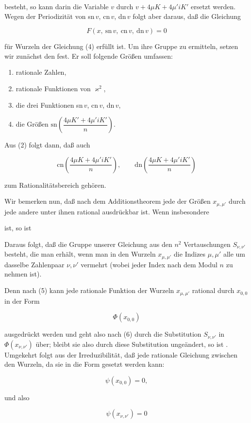 
besteht, so kann darin die Variable $v$ durch $v + 4\mu K + 4\mu' iK'$
ersetzt werden. Wegen der Periodizität von sn\,$v$, cn\,$v$, dn\,$v$ folgt
aber daraus, daß die Gleichung

\[
F(x,\ \mathrm{sn}\,v,\ \mathrm{cn}\,v,\ \mathrm{dn}\,v) = 0
\]

für  Wurzeln der Gleichung (4) erfüllt ist. Um ihre  Gruppe zu ermitteln, setzen wir zunächst den  fest. Er soll folgende Größen umfassen:

\begin{enumerate}
\item[1.] rationale Zahlen,
\item[2.] rationale Funktionen von $\varkappa^2$,
\item[3.] die drei Funktionen sn\,$v$, cn\,$v$, dn\,$v$,
\item[4.] die Größen $\mathrm{sn}\left(\dfrac{4\mu K' + 4\mu' iK'}{n}\right)$. %
\end{enumerate}

Aus (2) folgt dann, daß auch

\[
\mathrm{cn}\left(\frac{4\mu K + 4\mu' iK'}{n}\right), \qquad \mathrm{dn}\left(\frac{4\mu K + 4\mu' iK'}{n}\right)
\]

zum Rationalitätsbereich gehören.

Wir bemerken nun, daß nach dem Additionstheorem jede der
Größen $x_{\mu,\mu'}$ durch jede andere unter ihnen rational ausdrückbar
ist. Wenn insbesondere


ist, so ist


Daraus folgt, daß die  Gruppe unserer Gleichung
aus den $n^2$ Vertauschungen $S_{\nu,\nu'}$ besteht, die man erhält, wenn
man in den Wurzeln $x_{\mu,\mu'}$ die Indizes $\mu, \mu'$ alle um dasselbe
Zahlenpaar $\nu, \nu'$ vermehrt (wobei jeder Index nach dem Modul $n$
zu nehmen ist).

Denn nach (5) kann jede rationale Funktion der Wurzeln
$x_{\mu,\mu'}$ rational durch $x_{0,0}$ in der Form

\[
\Phi(x_{0,0})
\]

ausgedrückt werden und geht also nach (6) durch die Substitution
$S_{\nu,\nu'}$ in $\Phi(x_{\nu,\nu'})$ über; bleibt sie also durch diese Substitution
ungeändert, so ist . Umgekehrt folgt aus der
Irreduzibilität, daß jede rationale Gleichung zwischen den Wurzeln,
da sie in die Form gesetzt werden kann:

\[
\psi(x_{0,0}) = 0,
\]

und also

\[
\psi(x_{\nu,\nu'}) = 0
\]
